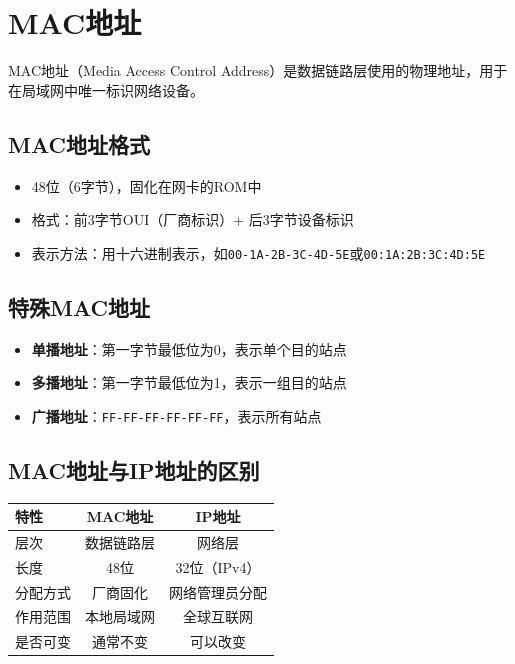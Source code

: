 \documentclass[12pt,a4paper,openany]{ctexbook}
\begin{document}
\section{MAC地址}
MAC地址（Media Access Control Address）是数据链路层使用的物理地址，用于在局域网中唯一标识网络设备。

\subsection{MAC地址格式}
\begin{itemize}[leftmargin=2em,itemsep=0pt]
    \item 48位（6字节），固化在网卡的ROM中
    \item 格式：前3字节OUI（厂商标识）+ 后3字节设备标识
    \item 表示方法：用十六进制表示，如\texttt{00-1A-2B-3C-4D-5E}或\texttt{00:1A:2B:3C:4D:5E}
\end{itemize}

\subsection{特殊MAC地址}
\begin{itemize}[leftmargin=2em,itemsep=0pt]
    \item \textbf{单播地址}：第一字节最低位为0，表示单个目的站点
    \item \textbf{多播地址}：第一字节最低位为1，表示一组目的站点
    \item \textbf{广播地址}：\texttt{FF-FF-FF-FF-FF-FF}，表示所有站点
\end{itemize}

\subsection{MAC地址与IP地址的区别}
\begin{table}[htbp]
\centering\small
\begin{tabular}{lcc}
\toprule
\textbf{特性} & \textbf{MAC地址} & \textbf{IP地址} \\
\midrule
层次 & 数据链路层 & 网络层 \\
长度 & 48位 & 32位（IPv4） \\
分配方式 & 厂商固化 & 网络管理员分配 \\
作用范围 & 本地局域网 & 全球互联网 \\
是否可变 & 通常不变 & 可以改变 \\
\bottomrule
\end{tabular}
\end{table}
\end{document}
